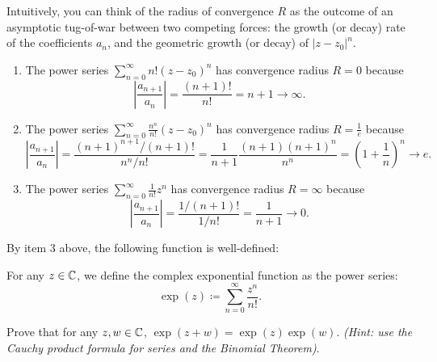 \documentclass[../analysis1.tex]{subfiles}
\begin{document}
\begin{remark}
    Intuitively, you can think of the radius of convergence $R$ as the outcome of an asymptotic tug-of-war between two competing forces: the growth (or decay) rate of the coefficients $a_n$, and the geometric growth (or decay) of $|z-z_0|^n$.
\end{remark}

\begin{example}
    \begin{enumerate}
        \item[1.] The power series $\sum_{n=0}^{\infty}n!(z-z_0)^n$ has convergence radius $R=0$ because \[\left|\frac{a_{n+1}}{a_n}\right|=\frac{(n+1)!}{n!}=n+1\to\infty.\]
        \item[2.] The power series $\sum_{n=0}^{\infty}\frac{n^n}{n!}(z-z_0)^n$ has convergence radius $R=\frac{1}{e}$ because \[ \left|\frac{a_{n+1}}{a_n}\right|=\frac{(n+1)^{n+1}/(n+1)!}{n^n/n!}=\frac{1}{n+1}\frac{(n+1)(n+1)^n}{n^n}=\left(1+\frac{1}{n}\right)^n\to e. \]
        \item[3.] The power series $\sum_{n=0}^{\infty}\frac{1}{n!}z^n$ has convergence radius $R=\infty$ because \[ \left|\frac{a_{n+1}}{a_n}\right|=\frac{1/(n+1)!}{1/n!}=\frac{1}{n+1}\to 0.\]
    \end{enumerate}
\end{example}
By item 3 above, the following function is well-defined:
\begin{definition}
    \begin{shaded*}
        For any $z \in \mathbb{C}$, we define the complex exponential function as the power series:
        \[ \exp(z) \coloneqq \sum_{n=0}^{\infty} \frac{z^n}{n!}. \]
    \end{shaded*}
\end{definition}
\begin{exercise*}
    Prove that for any $z,w\in\mathbb{C}$, $\exp(z+w)=\exp(z)\exp(w)$. \textit{(Hint: use the Cauchy product formula for series and the Binomial Theorem)}.
\end{exercise*}
\end{document}
